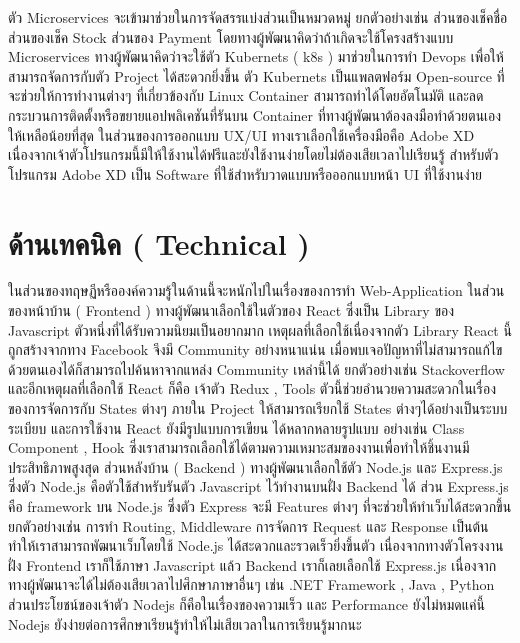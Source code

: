 ตัว Microservices จะเข้ามาช่วยในการจัดสรรแบ่งส่วนเป็นหมวดหมู่  ยกตัวอย่างเช่น  ส่วนของเช็คชื่อ  ส่วนของเช็ค Stock  ส่วนของ Payment  โดยทางผู้พัฒนาคิดว่าถ้าเกิดจะใช้โครงสร้างแบบ Microservices ทางผู้พัฒนาคิดว่าจะใช้ตัว Kubernets ( k8s ) มาช่วยในการทำ Devops เพื่อให้สามารถจัดการกับตัว Project ได้สะดวกยิ่งขึ้น 
ตัว Kubernets เป็นแพลตฟอร์ม Open-source ที่จะช่วยให้การทำงานต่างๆ ที่เกี่ยวข้องกับ Linux Container สามารถทำได้โดยอัตโนมัติ และลดกระบวนการติดตั้งหรือขยายแอปพลิเคชันที่รันบน Container ที่ทางผู้พัฒนาต้องลงมือทำด้วยตนเองให้เหลือน้อยที่สุด 
	ในส่วนของการออกแบบ UX/UI ทางเราเลือกใช้เครื่องมือคือ Adobe XD \cite{AdobeXD} เนื่องจากเจ้าตัวโปรแกรมนี้มีให้ใช้งานได้ฟรีและยังใช้งานง่ายโดยไม่ต้องเสียเวลาไปเรียนรู้ สำหรับตัวโปรแกรม Adobe XD เป็น Software ที่ใช้สำหรับวาดแบบหรือออกแบบหน้า UI ที่ใช้งานง่าย 
  
  
  

\section{ด้านเทคนิค ( Technical )}
ในส่วนของทฤษฏีหรือองค์ความรู้ในด้านนี้จะหนักไปในเรื่องของการทำ
Web-Application ในส่วนของหน้าบ้าน ( Frontend ) ทางผู้พัฒนาเลือกใช้ในตัวของ
React \cite{React} ซึ่งเป็น Library ของ Javascript ตัวหนึ่งที่ได้รับความนิยมเป็นอยากมาก เหตุผลที่เลือกใช้เนื่องจากตัว Library React นี้ถูกสร้างจากทาง Facebook 
จึงมี Community อย่างหนาแน่น  เมื่อพบเจอปัญหาที่ไม่สามารถแก้ไขด้วยตนเองได้ก็สามารถไปค้นหาจากแหล่ง Community เหล่านี้ได้ ยกตัวอย่างเช่น Stackoverflow 
และอีกเหตุผลที่เลือกใช้ React ก็คือ เจ้าตัว Redux \cite{Redux} ,  Tools ตัวนี้ช่วยอำนวยความสะดวกในเรื่องของการจัดการกับ States ต่างๆ  ภายใน Project ให้สามารถเรียกใช้ States ต่างๆได้อย่างเป็นระบบระเบียบ และการใช้งาน React ยังมีรูปแบบการเขียน
ได้หลากหลายรูปแบบ อย่างเช่น Class Component , Hook ซึ่งเราสามารถเลือกใช้ได้ตามความเหมาะสมของงานเพื่อทำให้ชิ้นงานมีประสิทธิภาพสูงสุด
ส่วนหลังบ้าน ( Backend ) ทางผู้พัฒนาเลือกใช้ตัว Node.js \cite{NodeJs} และ Express.js \cite{Express} ซึ่งตัว Node.js คือตัวใช้สำหรับรันตัว Javascript ไว้ทำงานบนฝั่ง Backend ได้  ส่วน Express.js คือ  framework บน Node.js 
ซึ่งตัว Express จะมี Features ต่างๆ  ที่จะช่วยให้ทำเว็บได้สะดวกขึ้น ยกตัวอย่างเช่น การทำ Routing, Middleware การจัดการ Request และ Response เป็นต้น  ทำให้เราสามารถพัฒนาเว็บโดยใช้ Node.js ได้สะดวกและรวดเร็วยิ่งขึ้นตัว
เนื่องจากทางตัวโครงงานฝั่ง Frontend เราก็ใช้ภาษา Javascript แล้ว Backend เราก็เลยเลือกใช้ Express.js  เนื่องจากทางผู้พัฒนาจะได้ไม่ต้องเสียเวลาไปศึกษาภาษาอื่นๆ เช่น  .NET Framework , Java , Python 
ส่วนประโยชน์ของเจ้าตัว Nodejs ก็คือในเรื่องของความเร็ว และ Performance ยังไม่หมดแค่นี้ Nodejs ยังง่ายต่อการศึกษาเรียนรู้ทำให้ไม่เสียเวลาในการเรียนรู้มากนะ 




